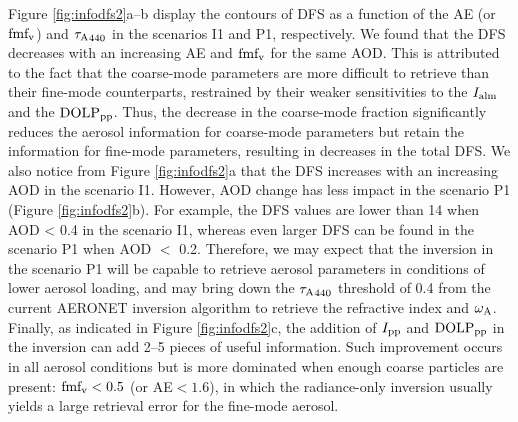 Figure \ref{fig:infodfs2}a--b display the contours of DFS as a function 
of the AE (or $\text{fmf}_\text{v}$) and ${\tau_\text{A}}_{440}$ in the scenarios I1 and P1, 
respectively. We found that the DFS decreases with an increasing AE and
$\text{fmf}_\text{v}$ for the same AOD. This is attributed to the fact that the 
coarse-mode parameters are more difficult to retrieve than their 
fine-mode counterparts, restrained by their weaker sensitivities to 
the $I_\text{alm}$ and the $\text{DOLP}_\text{pp}$. Thus, the decrease in the coarse-mode 
fraction significantly reduces the aerosol information for coarse-mode 
parameters but retain the information for fine-mode parameters, resulting in 
decreases in the total DFS. We also notice from Figure
\ref{fig:infodfs2}a that the DFS increases with an increasing AOD in the
scenario I1. However, AOD change has less impact in the scenario P1
(Figure \ref{fig:infodfs2}b). For example, the DFS values are lower than 14 
when AOD < 0.4 in the scenario I1, whereas even larger DFS can be found in 
the scenario P1 when AOD $<$ 0.2. Therefore, we may expect that the inversion 
in the scenario P1 will be capable to retrieve aerosol parameters in conditions
of lower aerosol loading, and may bring down the ${\tau_\text{A}}_{440}$ threshold of 
0.4 from the current AERONET inversion algorithm to retrieve the refractive
index and $\omega_\text{A}$. Finally, as indicated in Figure \ref{fig:infodfs2}c, 
the addition of $I_\text{pp}$ and $\text{DOLP}_\text{pp}$ in the inversion can add 2--5 pieces of 
useful information. Such improvement occurs in all aerosol conditions but is 
more dominated when enough coarse particles are present: $\text{fmf}_\text{v}<0.5$ (or
AE$<1.6$), in which the radiance-only inversion usually yields a large 
retrieval error for the fine-mode aerosol. 

